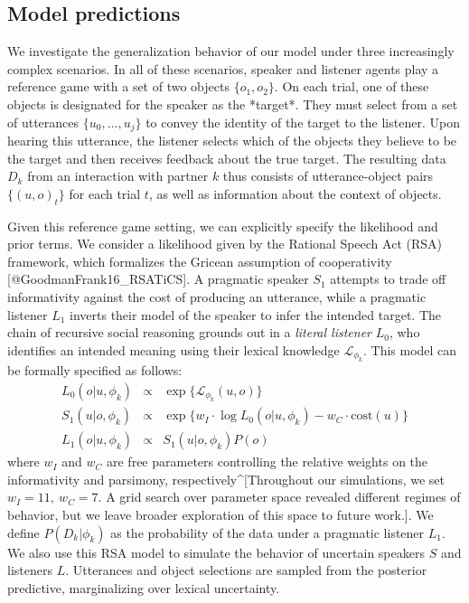 \documentclass[11pt, floatsintext]{apa6}
\begin{document}
\subsection{Model predictions}

We investigate the generalization behavior of our model under three increasingly complex scenarios. 
In all of these scenarios, speaker and listener agents play a reference game with a set of two objects $\{o_1, o_2\}$.
On each trial, one of these objects is designated for the speaker as the *target*. 
They must select from a set of utterances $\{u_0, \dots, u_j\}$ to convey the identity of the target to the listener.
Upon hearing this utterance, the listener selects which of the objects they believe to be the target and then receives feedback about the true target.
The resulting data $D_k$ from an interaction with partner $k$ thus consists of utterance-object pairs $\{(u, o)_t\}$ for each trial $t$, as well as information about the context of objects.

Given this reference game setting, we can explicitly specify the likelihood and prior terms. 
We consider a likelihood given by the Rational Speech Act (RSA) framework, which formalizes the Gricean assumption of cooperativity [@GoodmanFrank16_RSATiCS].
A pragmatic speaker $S_1$ attempts to trade off informativity against the cost of producing an utterance, while a pragmatic listener $L_1$ inverts their model of the speaker to infer the intended target.
The chain of recursive social reasoning grounds out in a \emph{literal listener} $L_0$, who identifies an intended meaning using their lexical knowledge $\mathcal{L}_{\phi_k}$. 
This model can be formally specified as follows:
$$
\begin{array}{rcl}
L_0(o | u, \phi_k) &\propto  & \exp\{\mathcal{L}_{\phi_k}(u,o)\} \\
S_1(u | o, \phi_k) &\propto &  \exp\{w_I \cdot \log L_0(o | u, \phi_k) - w_C \cdot \textrm{cost}(u)\}   \\
L_1(o | u, \phi_k) &\propto  & S_1(u | o, \phi_k) P(o) 
\end{array}
$$
where $w_I$ and $w_C$ are free parameters controlling the relative weights on the informativity and parsimony, respectively^[Throughout our simulations, we set $w_I = 11,~w_C = 7$. A grid search over parameter space revealed different regimes of behavior, but we leave broader exploration of this space to future work.].
We define $P(D_k | \phi_k)$ as the probability of the data under a pragmatic listener $L_1$.
We also use this RSA model to simulate the behavior of uncertain speakers $S$ and listeners $L$. 
Utterances and object selections are sampled from the posterior predictive, marginalizing over lexical uncertainty.
\end{document}
